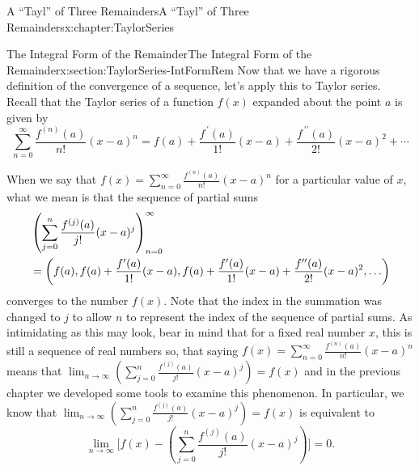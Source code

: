 \typeout{************************************************}
\typeout{************************************************}
%
\begin{chapterptx}{A ``Tayl'' of Three Remainders}{}{A ``Tayl'' of Three Remainders}{}{}{x:chapter:TaylorSeries}
	\typeout{************************************************}
	\typeout{************************************************}
	\begin{sectionptx}{The Integral Form of the Remainder}{}{The Integral Form of the Remainder}{}{}{x:section:TaylorSeries-IntFormRem}
		Now that we have a rigorous definition of the convergence of a sequence, let's apply this to Taylor series.  Recall that the Taylor series of a function \(f(x)\) expanded about the point \(a\) is given by%
		\begin{equation*}
			\sum_{n=0}^\infty\frac{f^{(n)}(a)}{n!}(x-a)^n=f(a)+\frac{f^{\,\prime}(a)}{1!}(x-a)+\frac{f^{\,\prime\prime}(a)}{2!}(x-a)^2+\cdots
		\end{equation*}
		\par
		When we say that \(f(x)=\sum_{n=0}^\infty\frac{f^{(n)}(a)}{n!}(x-a)^n\) for a particular value of \(x\), what we mean is that the sequence of partial sums%
		\begin{alignat*}{1}
			&\left(\sum_{j=0}^n\frac{f^{(j)}(a)}{j!}(x-a)^j\right)_{n=0}^\infty\\
			&= \left(f(a), f(a)+\frac{f^{\prime}(a)}{1!}(x-a),f(a)
			+\frac{f^{\prime}(a)}{1!}(x-a)+\frac{f^{\prime\prime}(a)}{2!}(x-a)^2,\ldots\right)
		\end{alignat*}
		converges to the number \(f(x)\). Note that the index in the summation was changed to \(j\) to allow \(n\) to represent the index of the sequence of partial sums. As intimidating as this may look, bear in mind that for a fixed real number \(x\), this is still a sequence of real numbers so, that saying \(f(x)=\sum_{n=0}^\infty\frac{f^{(n)}(a)}{n!}(x-a)^n\) means that \(\lim_{n\rightarrow\infty}\left(\sum_{j=0}^n\frac{f^{(j)}(a)}{j!}(x-a)^j\right)=f(x)\) and in the previous chapter we developed some tools to examine this phenomenon. In particular, we know that \(\lim_{n\rightarrow\infty}\left(\sum_{j=0}^n\frac{f^{(j)}(a)}{j!}(x-a)^j\right)=f(x)\) is equivalent to%
		\begin{equation*}
			\lim_{n\rightarrow\infty}\Biggl[f(x)-\left(\sum_{j=0}^n \frac{f^{(j)}(a)}{j!}(x-a)^j\right)\Biggr]=0\text{.}
		\end{equation*}

\end{sectionptx}
\end{chapterptx}
